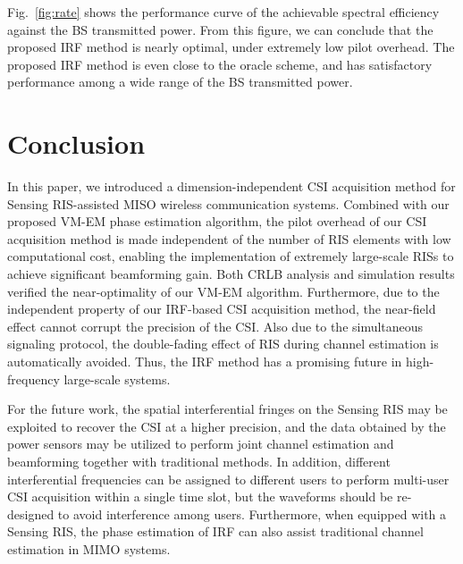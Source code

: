 \documentclass[12pt,draftclsnofoot,journal,onecolumn]{IEEEtran}
\theoremstyle{nonumberplain}
\begin{document}
    Fig.~\ref{fig:rate} shows the performance curve of the achievable spectral efficiency against the BS transmitted power. From this figure, we can conclude that the proposed IRF method is nearly optimal, under extremely low pilot overhead. The proposed IRF method is even close to the oracle scheme, and has satisfactory performance among a wide range of the BS transmitted power. 



\section{Conclusion}
\label{Conclusion}
    In this paper, we introduced a dimension-independent CSI acquisition method for Sensing RIS-assisted MISO wireless communication systems. 
    Combined with our proposed VM-EM phase estimation algorithm, the pilot overhead of our CSI acquisition method is made independent of the number of RIS elements with low computational cost, enabling the implementation of extremely large-scale RISs to achieve significant beamforming gain. 
    Both CRLB analysis and simulation results verified the near-optimality of our VM-EM algorithm. 
    Furthermore, due to the independent property of our \ac{IRF}-based CSI acquisition method, the near-field effect cannot corrupt the precision of the CSI. 
    Also due to the simultaneous signaling protocol, the double-fading effect of RIS during channel estimation is automatically avoided. 
    Thus, the \ac{IRF} method has a promising future in high-frequency large-scale systems. 
    
    For the future work, the spatial interferential fringes on the Sensing RIS may be exploited to recover the CSI at a higher precision, and the data obtained by the power sensors may be utilized to perform joint channel estimation and beamforming together with traditional methods. 
    In addition, different interferential frequencies can be assigned to different users to perform multi-user CSI acquisition within a single time slot, but the waveforms should be re-designed to avoid interference among users. 
    Furthermore, when equipped with a Sensing RIS, the phase estimation of IRF can also assist traditional channel estimation in MIMO systems. 

\appendices
\end{document}
